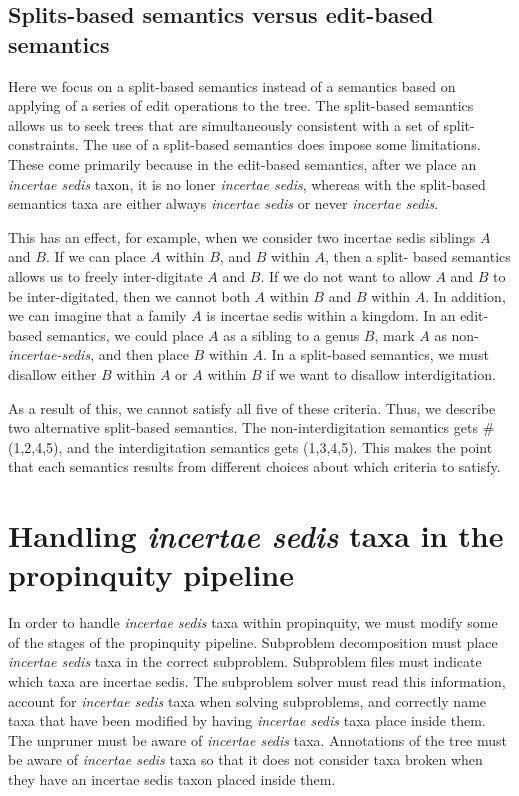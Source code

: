 \documentclass[english]{article}
\begin{document}

\subsection{Splits-based semantics versus edit-based semantics}

Here we focus on a split-based semantics instead of a semantics based on applying
of a series of edit operations to the tree. The split-based semantics allows us
to seek trees that are simultaneously consistent with a set of split-constraints.
The use of a split-based semantics does impose some limitations. These come
primarily because in the edit-based semantics, after we place an
\emph{incertae sedis} taxon, it is no loner \emph{incertae sedis}, whereas with
the split-based semantics taxa are either always \emph{incertae sedis} or never
\emph{incertae sedis}.

This has an effect, for example, when we consider two incertae sedis siblings $A$
and $B$. If we can place $A$ within $B$, and $B$ within $A$, then a split- based
semantics allows us to freely inter-digitate $A$ and $B$. If we do not want to
allow $A$ and $B$ to be inter-digitated, then we cannot both $A$ within $B$ and $B$
within $A$. In addition, we can imagine that a family $A$ is incertae sedis within a
kingdom. In an edit-based semantics, we could place $A$ as a sibling to a genus $B$,
mark $A$ as non-\emph{incertae-sedis}, and then place $B$ within $A$. In a split-based
semantics, we must disallow either $B$ within $A$ or $A$ within $B$ if we want to disallow
interdigitation.

As a result of this, we cannot satisfy all five of these criteria. Thus, we
describe two alternative split-based semantics. The non-interdigitation
semantics gets \# (1,2,4,5), and the interdigitation semantics gets (1,3,4,5).
This makes the point that each semantics results from different choices about
which criteria to satisfy.






\section{Handling \emph{incertae sedis} taxa in the propinquity
pipeline}

In order to handle \emph{incertae sedis} taxa within propinquity, we
must modify some of the stages of the propinquity pipeline.
Subproblem
decomposition must place \emph{incertae sedis} taxa in the correct
subproblem.
Subproblem files must indicate which taxa are incertae
sedis.
The subproblem solver must read this information, account for
\emph{incertae sedis} taxa when solving subproblems, and correctly
name taxa that have been modified by having \emph{incertae sedis} taxa
place inside them.
The unpruner must be aware of \emph{incertae sedis}
taxa.
Annotations of the tree must be aware of \emph{incertae sedis}
taxa so that it does not consider taxa broken when they have an
incertae sedis taxon placed inside them.
\end{document}
